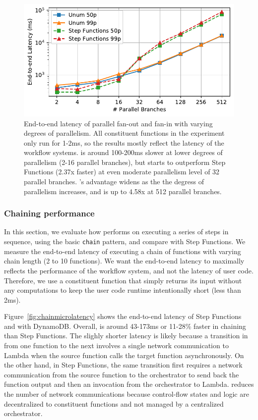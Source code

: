 \begin{figure}[t!]
    \centering
    \includegraphics[width=\columnwidth]{figures/MapMicroLatency.pdf}
    \caption{End-to-end latency of parallel fan-out and fan-in with varying
    degrees of parallelism. All constituent functions in the experiment only
    run for 1-2ms, so the results mostly reflect the latency of the workflow
    systems. \name{} is around 100-200ms slower at lower degrees of
    parallelism (2-16 parallel branches), but starts to outperform Step
    Functions (2.37x faster) at even moderate parallelism level of 32 parallel
    branches. \name{}'s advantage widens as the the degress of parallelism
    increases, and is up to 4.58x at 512 parallel branches.}
    \label{fig:mapmicrolatency}
\end{figure}

\subsubsection{Chaining performance}\label{sec:eval:chain}

In this section, we evaluate how \name{} performs on executing a series of
steps in sequence, using the basic \texttt{chain} pattern, and compare with
Step Functions. We measure the end-to-end latency of executing a chain of
functions with varying chain length (2 to 10 functions). We want the
end-to-end latency to maximally reflects the performance of the workflow
system, and not the latency of user code. Therefore, we use a constituent
function that simply returns its input without any computations to keep the
user code runtime intentionally short (less than 2ms).

Figure~\ref{fig:chainmicrolatency} shows the end-to-end latency of Step
Functions and \name{} with DynamoDB. Overall, \name{} is around 43-173ms or
11-28\% faster in chaining than Step Functions. The slighly shorter latency is
likely because a transition in \name{} from one function to the next involves
a single network communication to Lambda when the source function calls the
target function asynchronously. On the other hand, in Step Functions, the same
transition first requires a network communication from the source function to
the orchestrator to send back the function output and then an invocation from
the orchestrator to Lambda. \name{} reduces the number of network
communications because control-flow states and logic are decentralized to
constituent functions and not managed by a centralized orchestrator.


